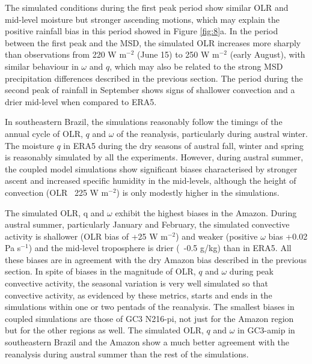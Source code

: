 The simulated conditions during the first peak period show similar OLR and mid-level moisture but stronger ascending motions, which may explain the positive rainfall bias in this period showed in Figure \ref{fig:8}a.
In the period between the first peak and the MSD, the simulated OLR increases more sharply than observations from 220 W m$^{-2}$ (June 15) to 250 W m$^{-2}$ (early August), with similar behaviour in $\omega$ and $q$, which may also be related to the strong MSD precipitation differences described in the previous section.
The period during the second peak of rainfall in September shows signs of shallower convection and a drier mid-level when compared to ERA5.

In southeastern Brazil, the simulations reasonably follow the timings of the annual cycle of OLR, $q$ and $\omega$ of the reanalysis, particularly during austral winter. The moisture $q$ in ERA5 during  the dry seasons of austral fall, winter and spring is reasonably simulated by all the experiments. However, during austral summer, the coupled model simulations show significant biases characterised by stronger ascent and increased specific humidity in the mid-levels, although the height of convection (OLR~ 225 W m$^{-2}$) is only modestly higher in the simulations.

The simulated OLR, q and $\omega$ exhibit the highest biases in the Amazon. During austral summer, particularly January and February, the simulated convective activity is shallower (OLR bias of +25 W m$^{-2}$) and weaker (positive $\omega$ bias +0.02 Pa s$^{-1}$) and the mid-level troposphere is drier (~-0.5 g/kg) than in ERA5. All these biases are in agreement with the dry Amazon bias described in the previous section. In spite of biases in the magnitude of OLR, $q$ and $\omega$ during peak convective activity, the seasonal variation is very well simulated so that convective activity, as evidenced by these metrics, starts and ends in the simulations within one or two pentads of the reanalysis. The smallest biases in coupled simulations are those of GC3 N216-pi, not just for the Amazon region but for the other regions as well.  The simulated OLR, $q$ and $\omega$ in GC3-amip in southeastern Brazil and the Amazon show a much better agreement with the reanalysis during austral summer than the rest of the simulations.

